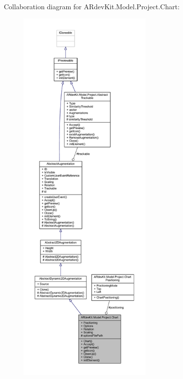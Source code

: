 Collaboration diagram for A\-Rdev\-Kit.\-Model.\-Project.\-Chart\-:
\nopagebreak
\begin{figure}[H]
\begin{center}
\leavevmode
\includegraphics[height=550pt]{class_a_rdev_kit_1_1_model_1_1_project_1_1_chart__coll__graph}
\end{center}
\end{figure}
